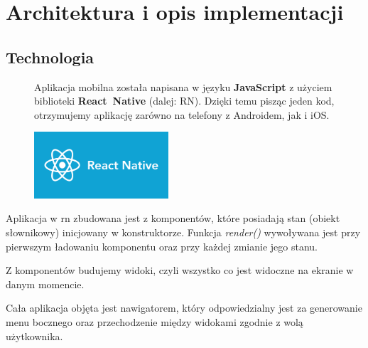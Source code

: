 \section{Architektura i opis implementacji}

\subsection{Technologia}
\begin{figure}[!htb]
    \centering
    \begin{minipage}{.6\textwidth}
Aplikacja mobilna została napisana w języku \textbf{JavaScript} z użyciem biblioteki \textbf{React~Native} (dalej: RN). Dzięki temu pisząc jeden kod, otrzymujemy aplikację zarówno na telefony z Androidem, jak i iOS.
    \end{minipage}%
    \begin{minipage}{.4\textwidth}
        \centering
        \includegraphics[width=5cm]{images/ReactNative.png}\label{RN_logo}
    \end{minipage}
\end{figure}

Aplikacja w \acrshort{rn} zbudowana jest z komponentów, które posiadają stan (obiekt słownikowy) inicjowany w konstruktorze. Funkcja \textit{render()} wywoływana jest przy pierwszym ładowaniu komponentu oraz przy każdej zmianie jego stanu. 

Z komponentów budujemy widoki, czyli wszystko co jest widoczne na ekranie w danym momencie.

Cała aplikacja objęta jest nawigatorem, który odpowiedzialny jest za generowanie menu bocznego oraz przechodzenie między widokami zgodnie z wolą użytkownika. \\

